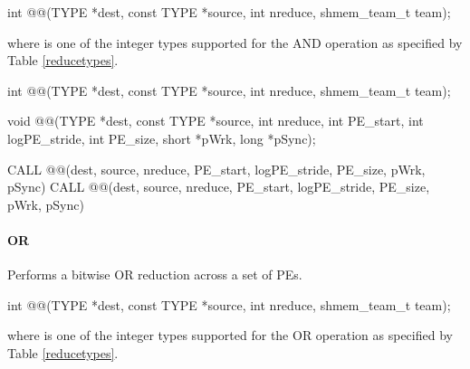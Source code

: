 \begin{apidefinition}
{\color{Green}
\begin{C11synopsis}
int @@(TYPE *dest, const TYPE *source, int nreduce, shmem_team_t team);
\end{C11synopsis}
where \TYPE{} is one of the integer types supported for the AND operation as specified by Table \ref{reducetypes}.
}

\begin{Csynopsis}
\end{Csynopsis}
{\color{Green}
\begin{CsynopsisCol}
int @@(TYPE *dest, const TYPE *source, int nreduce, shmem_team_t team);
\end{CsynopsisCol}
}
\begin{DeprecateBlock}
\begin{CsynopsisCol}
void @@(TYPE *dest, const TYPE *source, int nreduce, int PE_start, int logPE_stride, int PE_size, short *pWrk, long *pSync);
\end{CsynopsisCol}
\end{DeprecateBlock}

\begin{Fsynopsis}
CALL @@(dest, source, nreduce, PE_start, logPE_stride, PE_size, pWrk, pSync)
CALL @@(dest, source, nreduce, PE_start, logPE_stride, PE_size, pWrk, pSync)
\end{Fsynopsis}

\paragraph{OR}
Performs a bitwise OR reduction across a set of \acp{PE}.\newline

{\color{Green}
\begin{C11synopsis}
int @@(TYPE *dest, const TYPE *source, int nreduce, shmem_team_t team);
\end{C11synopsis}
where \TYPE{} is one of the integer types supported for the OR operation as specified by Table \ref{reducetypes}.
}


\end{apidefinition}
